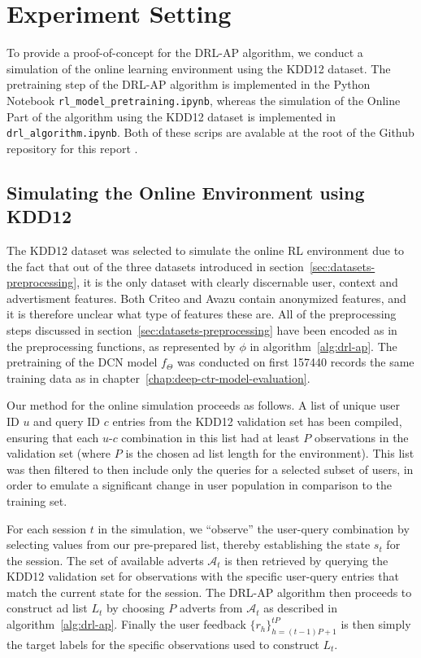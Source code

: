 \documentclass{mldsmsc}
\begin{document}
\section{Experiment Setting}

To provide a proof-of-concept for the DRL-AP algorithm, we conduct a simulation of the online
learning environment using the KDD12 dataset. The pretraining step of the DRL-AP algorithm 
is implemented in the Python Notebook \verb|rl_model_pretraining.ipynb|,
whereas the simulation of the Online Part of the algorithm using the KDD12 dataset is implemented in
\verb|drl_algorithm.ipynb|. Both of these scrips are avalable at the root of the Github repository
for this report \citep{Batek_Deep_Reinforcement_Leaning_2024}.

\subsection{Simulating the Online Environment using KDD12}
\label{sec:sim-description}

The KDD12 dataset was selected to simulate the online RL environment due to the fact that out
of the three datasets introduced in section~\ref{sec:datasets-preprocessing}, it is the
only dataset with clearly discernable user, context and advertisment features. Both Criteo
and Avazu contain anonymized features, and it is therefore unclear what type of features these are.
All of the preprocessing steps discussed in section~\ref{sec:datasets-preprocessing} have 
been encoded as in the preprocessing functions, as represented by $\phi$ in algorithm~\ref{alg:drl-ap}.
The pretraining of the DCN model $f_{\Theta}$ was conducted on first 157440 records the same training
data as in chapter~\ref{chap:deep-ctr-model-evaluation}. 

Our method for the online simulation proceeds as follows. A list of unique
user ID $u$ and query ID $c$ entries from the KDD12 validation set has been compiled, ensuring that each
$u$-$c$ combination in this list had at least $P$ observations in the validation set (where $P$ is the chosen ad list length
for the environment). This list was then filtered to then include only the queries for a
selected subset of users, in order to emulate a significant change in user population in
comparison to the training set.

For each session $t$ in the simulation, we ``observe'' the
user-query combination by selecting values from our pre-prepared list, thereby
establishing the state $s_t$ for the session. The set of available adverts $\mathcal{A}_t$ is
then retrieved by querying the KDD12 validation set for observations with the
specific user-query entries that match the current state for the session. The DRL-AP
algorithm then proceeds to construct ad list $L_t$ by choosing $P$ adverts from $\mathcal{A}_t$ as described
in algorithm~\ref{alg:drl-ap}. Finally the user feedback $\{r_h\}_{h=(t-1)P+1}^{tP}$
is then simply the target labels for the specific observations used to construct $L_t$.
\end{document}
